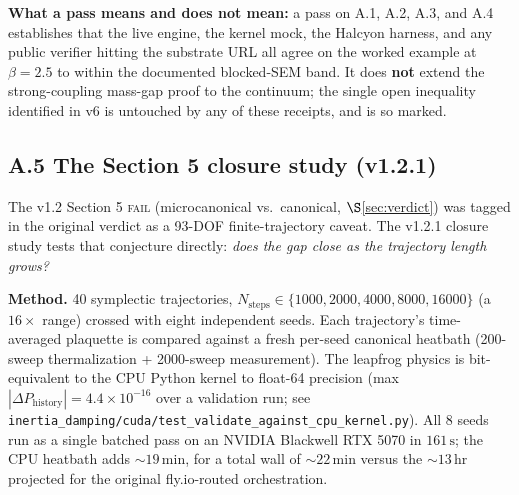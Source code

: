 \documentclass[12pt,a4paper]{article}
\theoremstyle{plain}
\theoremstyle{definition}
\theoremstyle{remark}
\begin{document}
\textbf{What a pass means and does not mean:} a pass on A.1, A.2, A.3, and A.4 establishes that the live engine, the kernel mock, the Halcyon harness, and any public verifier hitting the substrate URL all agree on the worked example at $\beta = 2.5$ to within the documented blocked-SEM band. It does \textbf{not} extend the strong-coupling mass-gap proof to the continuum; the single open inequality identified in v6 is untouched by any of these receipts, and is so marked.

\subsection*{A.5 The Section 5 closure study (v1.2.1)}

The v1.2 Section 5 \textsc{fail} (microcanonical vs.\ canonical, $\S$\ref{sec:verdict}) was tagged in the original verdict as a 93-DOF finite-trajectory caveat. The v1.2.1 closure study tests that conjecture directly: \emph{does the gap close as the trajectory length grows?}

\textbf{Method.} 40 symplectic trajectories, $N_{\mathrm{steps}} \in \{1000, 2000, 4000, 8000, 16000\}$ (a $16\times$ range) crossed with eight independent seeds. Each trajectory's time-averaged plaquette is compared against a fresh per-seed canonical heatbath (200-sweep thermalization + 2000-sweep measurement). The leapfrog physics is bit-equivalent to the CPU Python kernel to float-64 precision (max $|\Delta P_{\mathrm{history}}| = 4.4\times10^{-16}$ over a validation run; see \texttt{inertia\_damping/cuda/test\_validate\_against\_cpu\_kernel.py}). All 8 seeds run as a single batched pass on an NVIDIA Blackwell RTX 5070 in $161\,\mathrm{s}$; the CPU heatbath adds $\sim 19\,\mathrm{min}$, for a total wall of $\sim 22\,\mathrm{min}$ versus the $\sim 13\,\mathrm{hr}$ projected for the original fly.io-routed orchestration.
\end{document}
